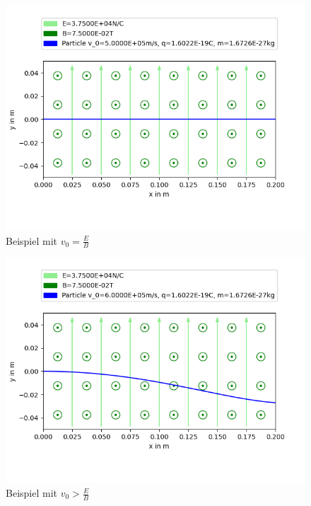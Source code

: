 \documentclass[a4paper, 10pt]{article}
\begin{document}
\begin{figure}[ht]
\caption{Beispiel mit $v_0=\frac{E}{B}$}
\centering
\includegraphics[width=\textwidth]{figure_3}
\end{figure}
\begin{figure}[ht]
\caption{Beispiel mit $v_0>\frac{E}{B}$}
\centering
\includegraphics[width=\textwidth]{figure_1}
\end{figure}
\end{document}
